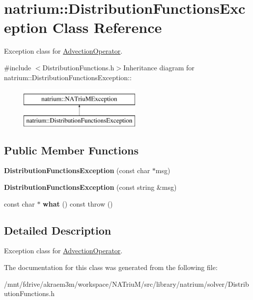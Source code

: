 \hypertarget{classnatrium_1_1DistributionFunctionsException}{
\section{natrium::DistributionFunctionsException Class Reference}
\label{classnatrium_1_1DistributionFunctionsException}
}


Exception class for \hyperlink{classnatrium_1_1AdvectionOperator}{AdvectionOperator}.  


{\ttfamily \#include $<$DistributionFunctions.h$>$}Inheritance diagram for natrium::DistributionFunctionsException::\begin{figure}[H]
\begin{center}
\leavevmode
\includegraphics[height=2cm]{classnatrium_1_1DistributionFunctionsException}
\end{center}
\end{figure}
\subsection*{Public Member Functions}
\begin{DoxyCompactItemize}
\item 
\hypertarget{classnatrium_1_1DistributionFunctionsException_aed6ffe30d7f1c8595c59d9a45f381329}{
{\bfseries DistributionFunctionsException} (const char $\ast$msg)}
\label{classnatrium_1_1DistributionFunctionsException_aed6ffe30d7f1c8595c59d9a45f381329}

\item 
\hypertarget{classnatrium_1_1DistributionFunctionsException_ae4027489731fa096270f2bc9e25aca99}{
{\bfseries DistributionFunctionsException} (const string \&msg)}
\label{classnatrium_1_1DistributionFunctionsException_ae4027489731fa096270f2bc9e25aca99}

\item 
\hypertarget{classnatrium_1_1DistributionFunctionsException_acf371b91c38f5cd7ed0c4d630f6c62d3}{
const char $\ast$ {\bfseries what} () const   throw ()}
\label{classnatrium_1_1DistributionFunctionsException_acf371b91c38f5cd7ed0c4d630f6c62d3}

\end{DoxyCompactItemize}


\subsection{Detailed Description}
Exception class for \hyperlink{classnatrium_1_1AdvectionOperator}{AdvectionOperator}. 

The documentation for this class was generated from the following file:\begin{DoxyCompactItemize}
\item 
/mnt/fdrive/akraem3m/workspace/NATriuM/src/library/natrium/solver/DistributionFunctions.h\end{DoxyCompactItemize}
